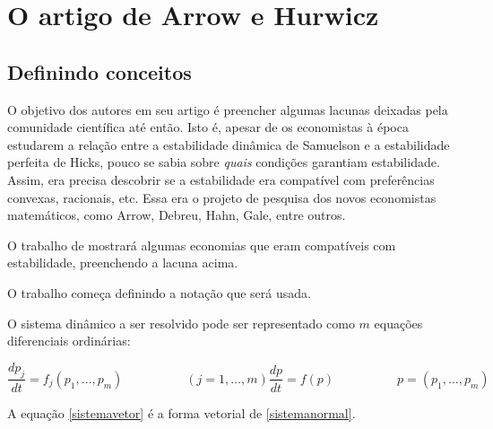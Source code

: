 \documentclass[
	12pt,				%
	openright,			%
	twoside,			%
	a4paper,			%
	english,			%
	french,				%
	spanish,			%
	brazil				%
	]{abntex2}
\newcommand{\espaco}{\hspace{5em}}
\begin{document}

\chapter{O artigo de Arrow e Hurwicz} \label{arrowhurwicz}

\section{Definindo conceitos}

O objetivo dos autores em seu artigo é preencher algumas lacunas deixadas
pela comunidade científica até então. Isto é, apesar de os economistas à época
estudarem a relação entre a estabilidade dinâmica de Samuelson e a estabilidade
perfeita de Hicks, pouco se sabia sobre \textit{quais} condições garantiam estabilidade.
Assim, era precisa descobrir se a estabilidade era compatível com preferências
convexas, racionais, etc. Essa era o projeto de pesquisa dos novos economistas matemáticos,
como Arrow, Debreu, Hahn, Gale, entre outros.

O trabalho de  mostrará algumas economias que eram
compatíveis com estabilidade, preenchendo a lacuna acima.

O trabalho começa definindo a notação que será usada.

O sistema dinâmico a ser resolvido pode ser representado como $m$ equações
diferenciais ordinárias:

\begin{subequations}

	\begin{equation} \label{sistemanormal}
	 	\frac{dp_j}{dt} = f_j(p_1, \ldots, p_m) \espaco (j = 1, \ldots, m)
	\end{equation}

	\begin{equation} \label{sistemavetor}
		\frac{dp}{dt} = f(p) \espaco p = (p_1, \ldots, p_m)
	\end{equation}

\end{subequations}

A equação \ref{sistemavetor} é a forma vetorial de \ref{sistemanormal}.
\end{document}
